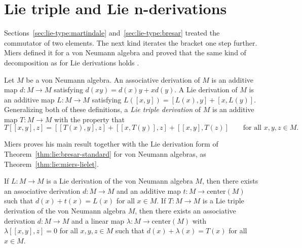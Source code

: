 \section{Lie triple and Lie n-derivations}\label{sec:lie-type:triple-and-n}

Sections~\ref{sec:lie-type:martindale} and~\ref{sec:lie-type:bresar} treated the
commutator of two elements. The next kind iterates the bracket one step further.
Miers defined it for a von Neumann algebra and proved that the same kind of
decomposition as for Lie derivations holds \cite[p.~57]{Miers1978}.

\begin{definition}\label{def:lie:miers}
Let $M$ be a von Neumann algebra. An
associative derivation of $M$ is an additive map $d\colon M\to M$ satisfying
$d(xy)=d(x)y+xd(y)$. A Lie derivation of $M$ is an additive map $L\colon M\to M$
satisfying $L([x,y])=[L(x),y]+[x,L(y)]$. Generalizing both of these definitions,
a \emph{Lie triple derivation} of $M$ is an additive map $T\colon M\to M$ with the
property that
\[
T[[x,y],z]=[[T(x),y],z]+[[x,T(y)],z]+[[x,y],T(z)]\qquad\text{for all }x,y,z\in M.
\]
\end{definition}

Miers proves his main result together with the Lie derivation form of
Theorem~\ref{thm:lie:bresar-standard} for von Neumann algebras, as
Theorem~\ref{thm:lie:miers-lielet}.

\begin{theorem}\label{thm:lie:miers-lielet}
If $L\colon M\to M$ is a Lie derivation of the von Neumann algebra $M$, then
there exists an associative derivation $d\colon M\to M$ and an additive map
$t\colon M\to \mathrm{center}(M)$ such that $d(x)+t(x)=L(x)$ for all $x\in M$.
If $T\colon M\to M$ is a Lie triple derivation of the von Neumann algebra $M$,
then there exists an associative derivation $d\colon M\to M$ and a linear map
$\lambda\colon M\to \mathrm{center}(M)$ with $\lambda[[x,y],z]=0$ for all
$x,y,z\in M$ such that $d(x)+\lambda(x)=T(x)$ for all $x\in M$.
\end{theorem}

